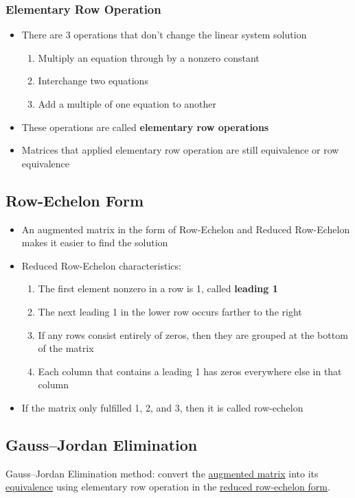 \documentclass[a4paper,12pt]{article}
\begin{document}
\subsubsection*{Elementary Row Operation}
\begin{itemize}
  \item There are 3 operations that don't change the linear system solution
        \begin{enumerate}
          \item Multiply an equation through by a nonzero constant
          \item Interchange two equations
          \item Add a multiple of one equation to another
        \end{enumerate}
  \item These operations are called \textbf{elementary row operations}
  \item Matrices that applied elementary row operation are still equivalence or row equivalence
\end{itemize}

\subsection*{Row-Echelon Form}
\begin{itemize}
  \item An augmented matrix in the form of Row-Echelon and Reduced Row-Echelon makes it easier to find the solution
  \item Reduced Row-Echelon characteristics:
        \begin{enumerate}
          \item The first element nonzero in a row is 1, called \textbf{leading 1}
          \item The next leading 1 in the lower row occurs farther to the right
          \item If any rows consist entirely of zeros, then they are grouped at the bottom of the matrix
          \item Each column that contains a leading 1 has zeros everywhere else in that column
        \end{enumerate}
  \item If the matrix only fulfilled 1, 2, and 3, then it is called row-echelon
\end{itemize}

\subsection*{Gauss–Jordan Elimination}
Gauss–Jordan Elimination method: convert the \underline{augmented matrix} into its \underline{equivalence} using elementary row operation in the \underline{reduced row-echelon form}.
\end{document}
